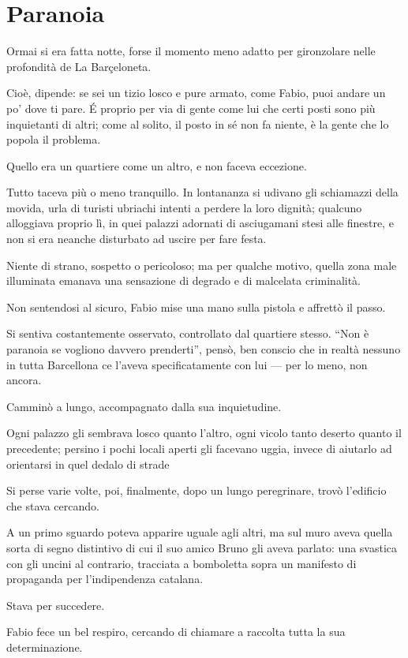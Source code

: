 \chapter{Paranoia}

Ormai si era fatta notte, forse il momento meno adatto per gironzolare nelle profondità de La Barçeloneta.

Cioè, dipende: se sei un tizio losco e pure armato, come Fabio, puoi andare un po' dove ti pare. É proprio per via di gente come lui che certi posti sono più inquietanti di altri; come al solito, il posto in sé non fa niente, è la gente che lo popola il problema.

Quello era un quartiere come un altro, e non faceva eccezione.

Tutto taceva più o meno tranquillo. In lontananza si udivano gli schiamazzi della movida, urla di turisti ubriachi intenti a perdere la loro dignità; qualcuno alloggiava proprio lì, in quei palazzi adornati di asciugamani stesi alle finestre, e non si era neanche disturbato ad uscire per fare festa.

Niente di strano, sospetto o pericoloso; ma per qualche motivo, quella zona male illuminata emanava una sensazione di degrado e di malcelata criminalità.

Non sentendosi al sicuro, Fabio mise una mano sulla pistola e affrettò il passo.

Si sentiva costantemente osservato, controllato dal quartiere stesso. ``Non è paranoia se vogliono davvero prenderti'', pensò, ben conscio che in realtà nessuno in tutta Barcellona ce l'aveva specificatamente con lui --- per lo meno, non ancora.

Camminò a lungo, accompagnato dalla sua inquietudine.

Ogni palazzo gli sembrava losco quanto l'altro, ogni vicolo tanto deserto quanto il precedente; persino i pochi locali aperti gli facevano uggia, invece di aiutarlo ad orientarsi in quel dedalo di strade

Si perse varie volte, poi, finalmente, dopo un lungo peregrinare, trovò l'edificio che stava cercando.

A un primo sguardo poteva apparire uguale agli altri, ma sul muro aveva quella sorta di segno distintivo di cui il suo amico Bruno gli aveva parlato: una svastica con gli uncini al contrario, tracciata a bomboletta sopra un manifesto di propaganda per l'indipendenza catalana.

Stava per succedere.

Fabio fece un bel respiro, cercando di chiamare a raccolta tutta la sua determinazione.

